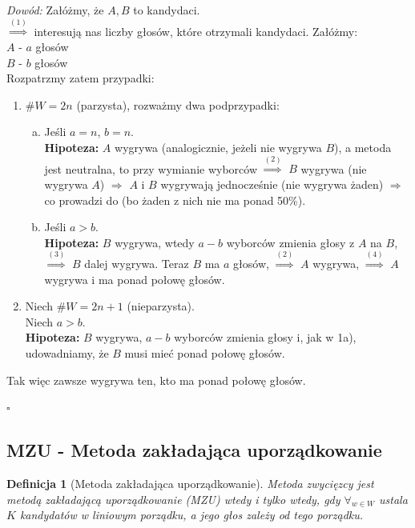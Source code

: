 \documentclass[12pt,a4paper]{article}
\theoremstyle{break}
\newtheorem{definition}{Definicja}[section]
\begin{document}
	\textit{Dowód:}
	Załóżmy, że $A,B$ to kandydaci.\\
	$\overset{(1)}{\Rightarrow}$ interesują nas liczby głosów, które otrzymali kandydaci. Załóżmy:\\
	$A$ - $a$ głosów\\
	$B$ - $b$ głosów\\
	Rozpatrzmy zatem przypadki:\\
	\begin{enumerate}[1$^\circ$]
		\item $\# W = 2n$ (parzysta), rozważmy dwa podprzypadki:
		\begin{enumerate}[a)]
			\item Jeśli $a=n$, $b=n$.\\
			\textbf{Hipoteza:} $A$ wygrywa (analogicznie, jeżeli nie wygrywa $B$), a metoda jest neutralna, to przy wymianie wyborców $\overset{(2)}{\Rightarrow}$ $B$ wygrywa (nie wygrywa $A$) $\Rightarrow$ $A$ i $B$ wygrywają jednocześnie (nie wygrywa żaden) $\Rightarrow$ co prowadzi do \faBolt (bo żaden z nich nie ma ponad 50\%).
			
			\item Jeśli $a>b$.\\
			\textbf{Hipoteza:} $B$ wygrywa, wtedy $a-b$ wyborców zmienia głosy z $A$ na $B$, $\overset{(3)}{\Rightarrow}$ $B$ dalej wygrywa. Teraz $B$ ma $a$ głosów, $\overset{(2)}{\Rightarrow}$ $A$ wygrywa, $\overset{(4)}{\Rightarrow}$ $A$ wygrywa i ma ponad połowę głosów.
		\end{enumerate}
		
		\item Niech $\# W = 2n+1$ (nieparzysta).\\
		Niech $a>b$.\\
		\textbf{Hipoteza:} $B$ wygrywa, $a-b$ wyborców zmienia głosy i, jak w 1a), udowadniamy, że $B$ musi mieć ponad połowę głosów.
	\end{enumerate}
	
	Tak więc zawsze wygrywa ten, kto ma ponad połowę głosów.
	\begin{flushright}$\square$\end{flushright}
	\subsection{MZU - Metoda zakładająca uporządkowanie}
	\begin{definition}[Metoda zakładająca uporządkowanie]
		Metoda zwycięzcy jest metodą zakładającą uporządkowanie (MZU) \textit{wtedy i tylko wtedy}, gdy $\forall_{w\in W}$ ustala $K$ kandydatów w liniowym porządku, a jego głos zależy od tego porządku.
	\end{definition}
	
\end{document}
